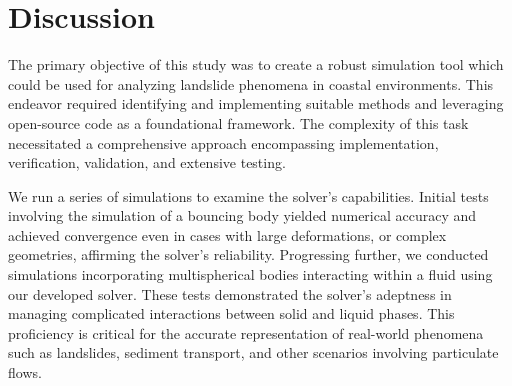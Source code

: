 \section{Discussion}


The primary objective of this study was to create a robust simulation tool which could be used for analyzing landslide phenomena in coastal environments. This endeavor required identifying and implementing suitable methods and leveraging open-source code as a foundational framework. The complexity of this task necessitated a comprehensive approach encompassing implementation, verification, validation, and extensive testing.

We run a series of simulations to examine the solver's capabilities. Initial tests involving the simulation of a bouncing body yielded numerical accuracy and achieved convergence even in cases with large deformations, or complex geometries, affirming the solver's reliability. Progressing further, we conducted simulations incorporating multispherical bodies interacting within a fluid using our developed solver. These tests demonstrated the solver's adeptness in managing complicated interactions between solid and liquid phases. This proficiency is critical for the accurate representation of real-world phenomena such as landslides, sediment transport, and other scenarios involving particulate flows.

